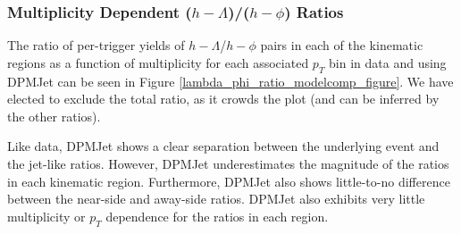\documentclass[ALICE,manyauthors]{ALICE_analysis_notes}
\begin{document}
\subsubsection{Multiplicity Dependent ($h-\Lambda$)/($h-\phi$) Ratios}
\label{lambda_phi_ratio_modelcomp}

The ratio of per-trigger yields of $h-\Lambda$/$h-\phi$ pairs in each of the kinematic regions as a function of multiplicity for each associated $p_{T}$ bin in data and using DPMJet can be seen in Figure \ref{lambda_phi_ratio_modelcomp_figure}. We have elected to exclude the total ratio, as it crowds the plot (and can be inferred by the other ratios). 

Like data, DPMJet shows a clear separation between the underlying event and the jet-like ratios. However, DPMJet underestimates the magnitude of the ratios in each kinematic region. Furthermore, DPMJet also shows little-to-no difference between the near-side and away-side ratios. DPMJet also exhibits very little multiplicity or $p_{T}$ dependence for the ratios in each region.
\end{document}
